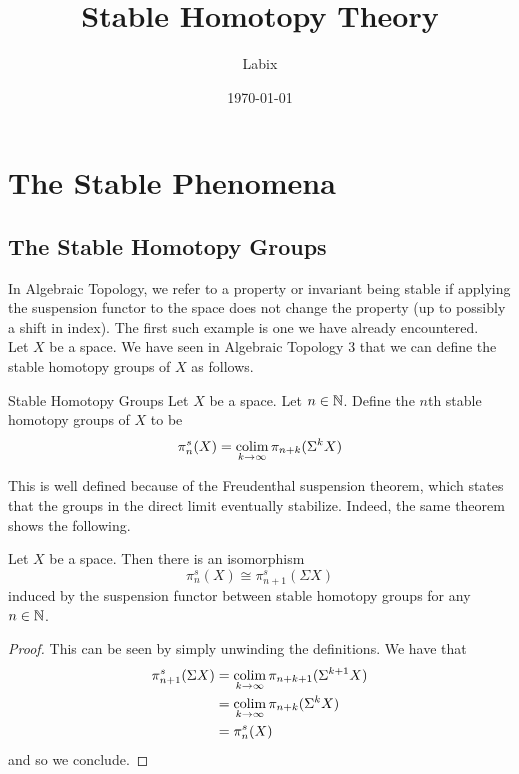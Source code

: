 \documentclass[a4paper]{article}
\title{Stable Homotopy Theory}
\author{Labix}
\date{\today}
\begin{document}
\maketitle
\begin{abstract}
\begin{itemize}
\end{itemize}
\end{abstract}
\pagebreak
\tableofcontents

\pagebreak
\section{The Stable Phenomena}
\subsection{The Stable Homotopy Groups}
In Algebraic Topology, we refer to a property or invariant being stable if applying the suspension functor to the space does not change the property (up to possibly a shift in index). The first such example is one we have already encountered. \\

Let $X$ be a space. We have seen in Algebraic Topology 3 that we can define the stable homotopy groups of $X$ as follows. 

\begin{defn}{Stable Homotopy Groups}{} Let $X$ be a space. Let $n\in\mathbb{N}$. Define the $n$th stable homotopy groups of $X$ to be $$\pi_n^s(X)=\operatorname*{colim}_{k\to\infty}\pi_{n+k}(\Sigma^kX)$$
\end{defn}

This is well defined because of the Freudenthal suspension theorem, which states that the groups in the direct limit eventually stabilize. Indeed, the same theorem shows the following. 

\begin{prp}{}{} Let $X$ be a space. Then there is an isomorphism $$\pi_n^s(X)\cong\pi_{n+1}^s(\Sigma X)$$ induced by the suspension functor between stable homotopy groups for any $n\in\mathbb{N}$. \tcbline
\begin{proof}
This can be seen by simply unwinding the definitions. We have that 
\begin{align*}
\pi_{n+1}^s(\Sigma X)&=\operatorname*{colim}_{k\to\infty}\pi_{n+k+1}(\Sigma^{k+1}X)\\
&=\operatorname*{colim}_{k\to\infty}\pi_{n+k}(\Sigma^kX)\\
&=\pi_n^s(X)
\end{align*}
and so we conclude. 
\end{proof}
\end{prp}
\end{document}
